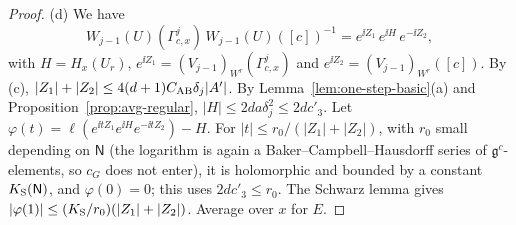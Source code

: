 \begin{proof}
(d) We have
\[
W_{j-1}(U)(\Gamma^j_{c,x})\,W_{j-1}(U)([c])^{-1}=e^{\ii Z_1}\,e^{\ii H}\,e^{-\ii Z_2},
\]
with $H=H_x(U_r)$, $e^{\ii Z_1}=(V_{j-1})_{W^r}(\Gamma^j_{c,x})$ and $e^{\ii Z_2}=(V_{j-1})_{W^r}([c])$. By (c), $|Z_1|+|Z_2|\le4(d+1)C_{\rm AB}\delta_j|A'|$. By Lemma~\ref{lem:one-step-basic}(a) and Proposition~\ref{prop:avg-regular}, $|H|\le2da\delta_j^2\le2dc'_3$. Let $\varphi(t)=\ell(e^{\ii tZ_1}e^{\ii H}e^{-\ii tZ_2})-H$. For $|t|\le r_0/(|Z_1|+|Z_2|)$, with $r_0$ small depending on $\mathsf N$ (the logarithm is again a Baker--Campbell--Hausdorff series of $\mathfrak g^c$-elements, so $c_G$ does not enter), it is holomorphic and bounded by a constant $K_{\rm S}(\mathsf N)$, and $\varphi(0)=0$; this uses $2dc'_3\le r_0$. The Schwarz lemma gives $|\varphi(1)|\le(K_{\rm S}/r_0)(|Z_1|+|Z_2|)$. Average over $x$ for $E$.
\end{proof}

